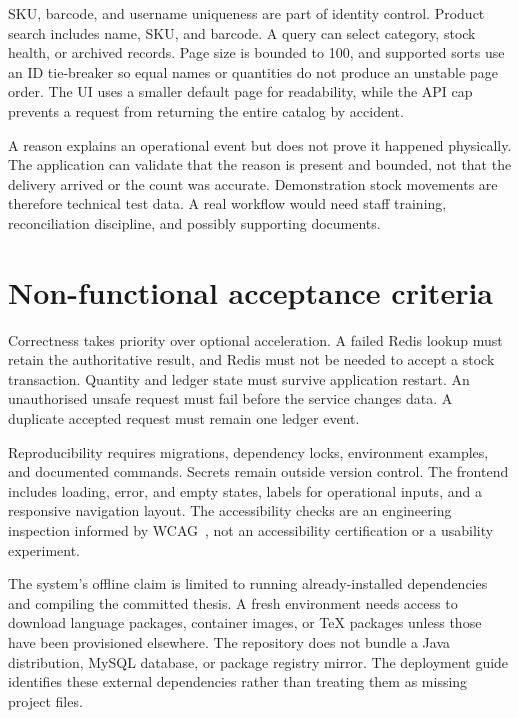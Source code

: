 SKU, barcode, and username uniqueness are part of identity control. Product search includes name, SKU, and barcode. A query can select category, stock health, or archived records. Page size is bounded to 100, and supported sorts use an ID tie-breaker so equal names or quantities do not produce an unstable page order. The UI uses a smaller default page for readability, while the API cap prevents a request from returning the entire catalog by accident.

A reason explains an operational event but does not prove it happened physically. The application can validate that the reason is present and bounded, not that the delivery arrived or the count was accurate. Demonstration stock movements are therefore technical test data. A real workflow would need staff training, reconciliation discipline, and possibly supporting documents.

\section{Non-functional acceptance criteria}
Correctness takes priority over optional acceleration. A failed Redis lookup must retain the authoritative result, and Redis must not be needed to accept a stock transaction. Quantity and ledger state must survive application restart. An unauthorised unsafe request must fail before the service changes data. A duplicate accepted request must remain one ledger event.

Reproducibility requires migrations, dependency locks, environment examples, and documented commands. Secrets remain outside version control. The frontend includes loading, error, and empty states, labels for operational inputs, and a responsive navigation layout. The accessibility checks are an engineering inspection informed by WCAG~\citep{wcag}, not an accessibility certification or a usability experiment.

The system's offline claim is limited to running already-installed dependencies and compiling the committed thesis. A fresh environment needs access to download language packages, container images, or TeX packages unless those have been provisioned elsewhere. The repository does not bundle a Java distribution, MySQL database, or package registry mirror. The deployment guide identifies these external dependencies rather than treating them as missing project files.
